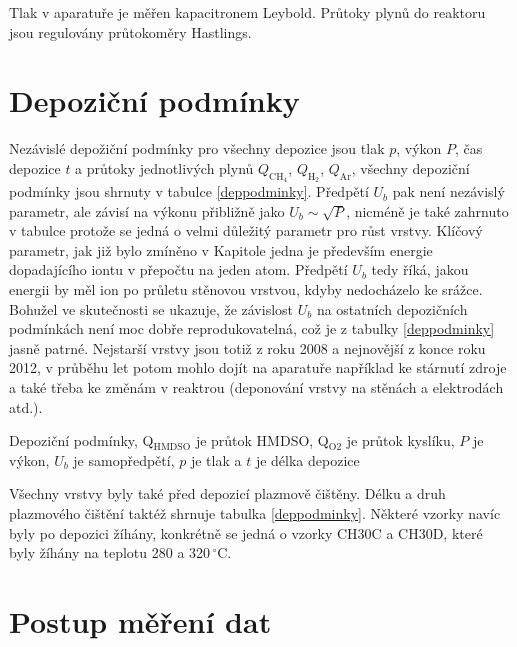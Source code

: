 Tlak v aparatuře je měřen kapacitronem Leybold. Průtoky plynů do reaktoru jsou regulovány průtokoměry Hastlings. 

\section{Depoziční podmínky}

Nezávislé depožiční podmínky pro všechny depozice jsou tlak $p$, výkon $P$, čas depozice $t$ a průtoky jednotlivých plynů $Q_{\mathrm{CH_4}}$, $Q_{\mathrm{H_2}}$, $Q_{\mathrm{Ar}}$, všechny depoziční podmínky jsou shrnuty v tabulce \ref{deppodminky}. Předpětí $U_b$ pak není nezávislý parametr, ale závisí na výkonu přibližně jako $U_b \sim \sqrt{P}$, nicméně je také zahrnuto v tabulce protože se jedná o velmi důležitý parametr pro růst vrstvy. Klíčový parametr, jak již bylo zmíněno v Kapitole jedna je především energie dopadajícího iontu v přepočtu na jeden atom. Předpětí $U_b$ tedy říká, jakou energii by měl ion po průletu stěnovou vrstvou, kdyby nedocházelo ke srážce. Bohužel ve skutečnosti se ukazuje, že závislost $U_b$ na ostatních depozičních podmínkách není moc dobře reprodukovatelná, což je z tabulky \ref{deppodminky} jasně patrné. Nejstarší vrstvy jsou totiž z roku 2008 a nejnovější z konce roku 2012, v průběhu let potom mohlo dojít na aparatuře například ke stárnutí zdroje a také třeba ke změnám v reaktrou (deponování vrstvy na stěnách a elektrodách atd.). 

\begin{table}[htbp]
 \centering
 \renewcommand{\tabcolsep}{1pt}
 
 \caption{Depoziční podmínky, Q$_\mathrm{{HMDSO}}$ je průtok HMDSO, Q$_\mathrm{O2}$ je průtok kyslíku, $P$ je výkon, $U_b$ je samopředpětí, $p$ je tlak a $t$ je délka depozice}
\label{deppodminky}
\end{table}

Všechny vrstvy byly také před depozicí plazmově čištěny. Délku a druh plazmového čištění taktéž shrnuje tabulka \ref{deppodminky}. Některé vzorky navíc byly po depozici žíhány, konkrétně se jedná o vzorky CH30C a CH30D, které byly žíhány na teplotu 280 a 320\,$^\circ$C.

\section{Postup měření dat}

